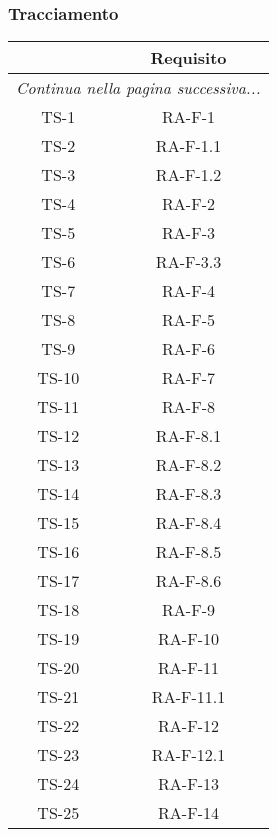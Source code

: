 	\subsubsection{Tracciamento}
		\begin{center}
			\begin{longtable}{|c|c|}
			\hline
			\rowcolor{lighter-grayer}{ \textbf{Codice} } & {\textbf{Requisito} } \\ \hline
			\endhead
			\multicolumn{2}{|c|}{\textit{Continua nella pagina successiva...}}\\
			\hline
			\hline
			\endfoot
			\endlastfoot

			\hline
			TS-1 & RA-F-1 \\
			\hline
			TS-2 & RA-F-1.1 \\
			\hline
			TS-3 & RA-F-1.2 \\
			\hline
			TS-4 & RA-F-2 \\
			\hline
			TS-5 & RA-F-3 \\
			\hline
			TS-6 & RA-F-3.3 \\
			\hline
			TS-7 & RA-F-4 \\
			\hline
			TS-8 & RA-F-5 \\
			\hline
			TS-9 & RA-F-6 \\
			\hline
			TS-10 & RA-F-7 \\
			\hline
			TS-11 & RA-F-8 \\
			\hline
			TS-12 & RA-F-8.1 \\
			\hline
			TS-13 & RA-F-8.2 \\
			\hline
			TS-14 & RA-F-8.3 \\
			\hline
			TS-15 & RA-F-8.4 \\
			\hline
			TS-16 & RA-F-8.5 \\
			\hline
			TS-17 & RA-F-8.6 \\
			\hline
			TS-18 & RA-F-9 \\
			\hline
			TS-19 & RA-F-10 \\
			\hline
			TS-20 & RA-F-11 \\
			\hline
			TS-21 & RA-F-11.1 \\
			\hline
			TS-22 & RA-F-12 \\
			\hline
			TS-23 & RA-F-12.1 \\
			\hline
			TS-24 & RA-F-13 \\
			\hline
			TS-25 & RA-F-14 \\

\end{longtable}
\end{center}
